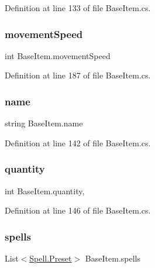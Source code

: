 Definition at line 133 of file Base\+Item.\+cs.

\mbox{\label{class_base_item_a82385b5a578c53ce385d30468d7931c7}} 
\subsubsection{\texorpdfstring{movementSpeed}{movementSpeed}}
{\footnotesize\ttfamily int Base\+Item.\+movement\+Speed\hspace{0.3cm}{\ttfamily [get]}}



Definition at line 187 of file Base\+Item.\+cs.

\mbox{\label{class_base_item_a6e4c68480321d8e7f4e1d20f7bb32044}} 
\subsubsection{\texorpdfstring{name}{name}}
{\footnotesize\ttfamily string Base\+Item.\+name\hspace{0.3cm}{\ttfamily [get]}}



Definition at line 142 of file Base\+Item.\+cs.

\mbox{\label{class_base_item_a9eddffb09a1b0e75ea6f17b13f4356af}} 
\subsubsection{\texorpdfstring{quantity}{quantity}}
{\footnotesize\ttfamily int Base\+Item.\+quantity\hspace{0.3cm}{\ttfamily [get]}, {\ttfamily [set]}}



Definition at line 146 of file Base\+Item.\+cs.

\mbox{\label{class_base_item_a00c4f617eb916f07056fe641f67e27ee}} 
\subsubsection{\texorpdfstring{spells}{spells}}
{\footnotesize\ttfamily List$<$\mbox{\hyperlink{class_spell_a5520e850e7000a6156b3456672b72ed1}{Spell.\+Preset}}$>$ Base\+Item.\+spells\hspace{0.3cm}{\ttfamily [get]}}



